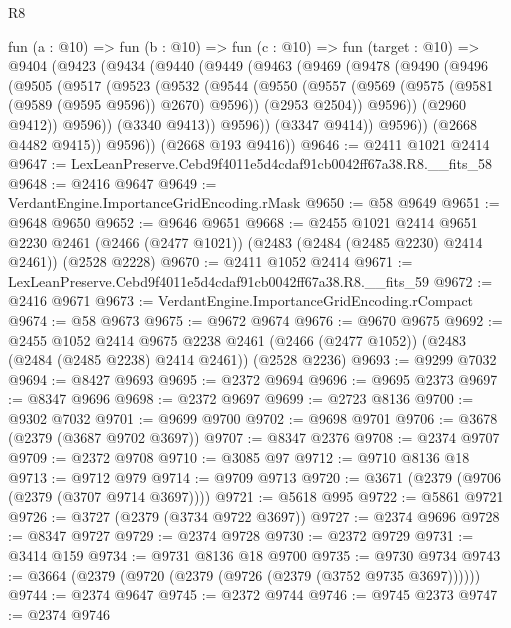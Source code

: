 \begin{lexlean}{R8}
\begin{coremodule}
  fun (a : @10) =>
  fun (b : @10) =>
  fun (c : @10) =>
  fun (target : @10) =>
  @9404
    (@9423
      (@9434
        (@9440
          (@9449
            (@9463
              (@9469
                (@9478
                  (@9490
                    (@9496
                      (@9505
                        (@9517
                          (@9523
                            (@9532
                              (@9544
                                (@9550
                                  (@9557
                                    (@9569 (@9575 (@9581 (@9589 (@9595 @9596)) @2670) @9596))
                                    (@2953 @2504))
                                  @9596))
                              (@2960 @9412))
                            @9596))
                        (@3340 @9413))
                      @9596))
                  (@3347 @9414))
                @9596))
            (@2668 @4482 @9415))
          @9596))
      (@2668 @193 @9416))
@9646 := @2411 @1021 @2414
@9647 := LexLeanPreserve.Cebd9f4011e5d4cdaf91cb0042ff67a38.R8.__fits_58
@9648 := @2416 @9647
@9649 := VerdantEngine.ImportanceGridEncoding.rMask
@9650 := @58 @9649
@9651 := @9648 @9650
@9652 := @9646 @9651
@9668 := @2455
    @1021
    @2414
    @9651
    @2230
    @2461
    (@2466 (@2477 @1021))
    (@2483 (@2484 (@2485 @2230) @2414 @2461))
    (@2528 @2228)
@9670 := @2411 @1052 @2414
@9671 := LexLeanPreserve.Cebd9f4011e5d4cdaf91cb0042ff67a38.R8.__fits_59
@9672 := @2416 @9671
@9673 := VerdantEngine.ImportanceGridEncoding.rCompact
@9674 := @58 @9673
@9675 := @9672 @9674
@9676 := @9670 @9675
@9692 := @2455
    @1052
    @2414
    @9675
    @2238
    @2461
    (@2466 (@2477 @1052))
    (@2483 (@2484 (@2485 @2238) @2414 @2461))
    (@2528 @2236)
@9693 := @9299 @7032
@9694 := @8427 @9693
@9695 := @2372 @9694
@9696 := @9695 @2373
@9697 := @8347 @9696
@9698 := @2372 @9697
@9699 := @2723 @8136
@9700 := @9302 @7032
@9701 := @9699 @9700
@9702 := @9698 @9701
@9706 := @3678 (@2379 (@3687 @9702 @3697))
@9707 := @8347 @2376
@9708 := @2374 @9707
@9709 := @2372 @9708
@9710 := @3085 @97
@9712 := @9710 @8136 @18
@9713 := @9712 @979
@9714 := @9709 @9713
@9720 := @3671 (@2379 (@9706 (@2379 (@3707 @9714 @3697))))
@9721 := @5618 @995
@9722 := @5861 @9721
@9726 := @3727 (@2379 (@3734 @9722 @3697))
@9727 := @2374 @9696
@9728 := @8347 @9727
@9729 := @2374 @9728
@9730 := @2372 @9729
@9731 := @3414 @159
@9734 := @9731 @8136 @18 @9700
@9735 := @9730 @9734
@9743 := @3664 (@2379 (@9720 (@2379 (@9726 (@2379 (@3752 @9735 @3697))))))
@9744 := @2374 @9647
@9745 := @2372 @9744
@9746 := @9745 @2373
@9747 := @2374 @9746

\end{coremodule}
\end{lexlean}
